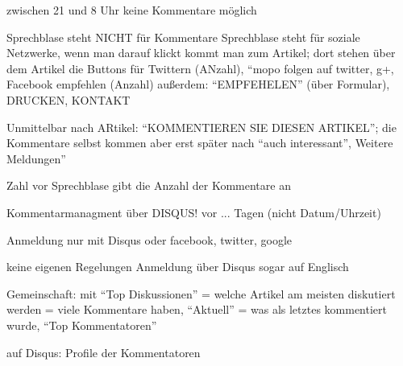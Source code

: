 zwischen 21 und 8 Uhr keine Kommentare möglich

Sprechblase steht NICHT für Kommentare
Sprechblase steht  für soziale Netzwerke, wenn man darauf klickt kommt man zum Artikel; dort stehen über dem Artikel die Buttons für Twittern (ANzahl), ``mopo folgen auf twitter, g+,  Facebook empfehlen (Anzahl) 
außerdem: ``EMPFEHELEN'' (über Formular), DRUCKEN, KONTAKT

Unmittelbar nach ARtikel:
``KOMMENTIEREN SIE DIESEN ARTIKEL''; die Kommentare selbst kommen aber erst später nach ``auch interessant'', Weitere Meldungen''

Zahl vor Sprechblase gibt die Anzahl der Kommentare an 

Kommentarmanagment über DISQUS!
vor ... Tagen (nicht Datum/Uhrzeit)

Anmeldung nur mit Disqus oder facebook, twitter, google

keine eigenen Regelungen
Anmeldung über Disqus sogar auf Englisch

Gemeinschaft: mit ``Top Diskussionen'' = welche Artikel am meisten diskutiert werden = viele Kommentare haben, ``Aktuell''  = was als letztes kommentiert wurde, ``Top Kommentatoren''

auf Disqus: Profile der Kommentatoren